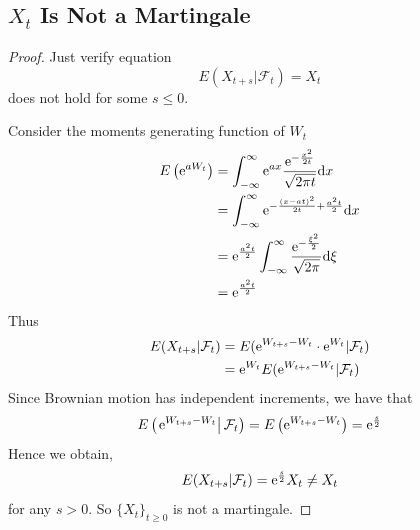 \documentclass{homework}
\begin{document}
    \subsection{$X_t$ Is Not a Martingale}
    \begin{proof}
        Just verify equation
        \[E(X_{t+s}|\mathcal F_t)=X_t\]
        does not hold for some $s\leq 0$.

        Consider the moments generating function of $W_t$
        \begin{equation}
            \label{eq:mgf}
            \begin{aligned}
            E\left(\mathrm e^{aW_t}\right)&=\int_{-\infty}^\infty
            \mathrm e^{ax}
            \frac{\mathrm e^{-\frac{x^2}{2t}}}{\sqrt{2\pi t}}
            \mathrm d x\\
            &=\int_{-\infty}^\infty
              \mathrm e^{-\frac{(x-at)^2}{2t}+\frac{a^2t}{2}}\mathrm d x\\
            &=\mathrm e^{\frac{a^2t}{2}}\int_{-\infty}^\infty
              \frac{\mathrm e^{-\frac{\xi^2}{2}}}{\sqrt{2\pi}}
              \mathrm d\xi\\
            &=\mathrm e^{\frac{a^2t}{2}}
            \end{aligned}
        \end{equation}
        Thus
        \[\begin{aligned}
            E(X_{t+s}|\mathcal F_t)&=E(\mathrm e^{W_{t+s}-W_t}\cdot\mathrm e^{W_t}|\mathcal F_t)\\
            &=\mathrm e^{W_t}E(\mathrm e^{W_{t+s}-W_t}|\mathcal F_t)
        \end{aligned}\]
        Since Brownian motion has independent increments, we have that
        \[E\left(\left.\mathrm e^{W_{t+s}-W_t}\right|\mathcal F_t\right)
        =E\left(\mathrm e^{W_{t+s}-W_t}\right)
        =\mathrm e^{\frac{s}{2}}\]
        Hence we obtain,
        \[E(X_{t+s}|\mathcal F_t)=\mathrm e^{\frac{s}{2}}X_t\neq X_t\]
        for any $s>0$. So $\{X_t\}_{t\geq 0}$ is not a martingale.

    \end{proof}
\end{document}
